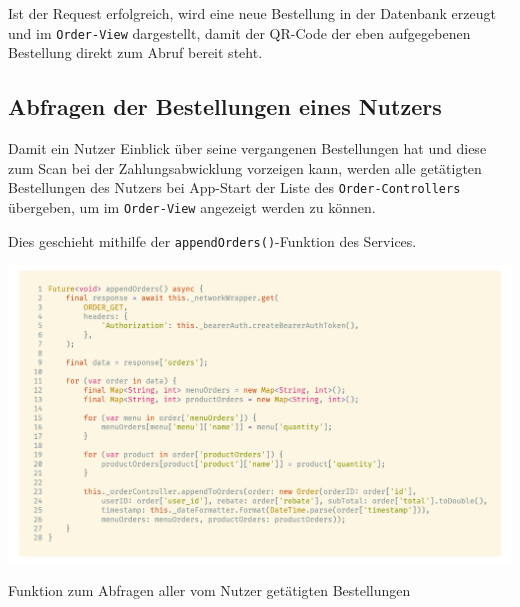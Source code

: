 Ist der Request erfolgreich, wird eine neue Bestellung in der Datenbank erzeugt und im 
\lstinline{Order-View} dargestellt, damit der QR-Code der eben aufgegebenen Bestellung
direkt zum Abruf bereit steht.

\subsection{Abfragen der Bestellungen eines Nutzers}

Damit ein Nutzer Einblick über seine vergangenen Bestellungen hat und diese zum Scan 
bei der Zahlungsabwicklung vorzeigen kann, werden alle getätigten Bestellungen des Nutzers bei App-Start
der Liste des \lstinline{Order-Controllers} übergeben, um im \lstinline{Order-View} angezeigt werden zu können.

Dies geschieht mithilfe der \lstinline{appendOrders()}-Funktion des Services.

\begin{code}[H]
    \centering
    \includegraphics[width=1\textwidth]{images/Client/services/manage-orders/appendOrders.png}
    \vspace{-25pt}
    \caption{Funktion zum Abfragen aller vom Nutzer getätigten Bestellungen}
\end{code}